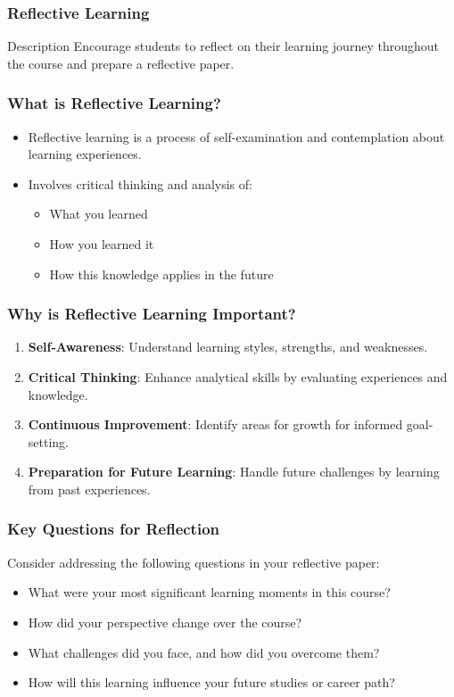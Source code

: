 \documentclass[aspectratio=169]{beamer}
\begin{document}
\begin{frame}[fragile]
    \frametitle{Reflective Learning}
    \begin{block}{Description}
        Encourage students to reflect on their learning journey throughout the course and prepare a reflective paper.
    \end{block}
\end{frame}

\begin{frame}[fragile]
    \frametitle{What is Reflective Learning?}
    \begin{itemize}
        \item Reflective learning is a process of self-examination and contemplation about learning experiences.
        \item Involves critical thinking and analysis of:
        \begin{itemize}
            \item What you learned
            \item How you learned it
            \item How this knowledge applies in the future
        \end{itemize}
    \end{itemize}
\end{frame}

\begin{frame}[fragile]
    \frametitle{Why is Reflective Learning Important?}
    \begin{enumerate}
        \item \textbf{Self-Awareness}: Understand learning styles, strengths, and weaknesses.
        \item \textbf{Critical Thinking}: Enhance analytical skills by evaluating experiences and knowledge.
        \item \textbf{Continuous Improvement}: Identify areas for growth for informed goal-setting.
        \item \textbf{Preparation for Future Learning}: Handle future challenges by learning from past experiences.
    \end{enumerate}
\end{frame}

\begin{frame}[fragile]
    \frametitle{Key Questions for Reflection}
    Consider addressing the following questions in your reflective paper:
    \begin{itemize}
        \item What were your most significant learning moments in this course?
        \item How did your perspective change over the course?
        \item What challenges did you face, and how did you overcome them?
        \item How will this learning influence your future studies or career path? 
    \end{itemize}
\end{frame}
\end{document}
